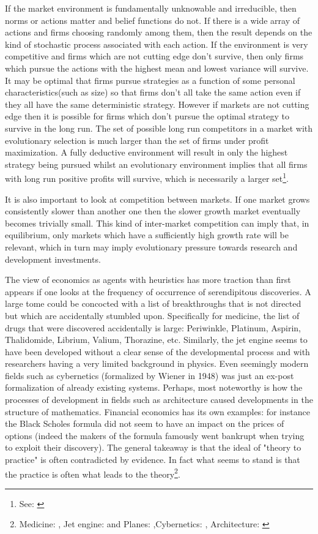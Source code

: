 If the market environment is fundamentally unknowable and irreducible, then norms or actions matter and belief functions do not. If there is a wide array of actions and firms choosing randomly among them, then the result depends on the kind of stochastic process associated with each action. If the environment is very competitive and firms which are not cutting edge don't survive, then only firms which pursue the actions with the highest mean and lowest variance will survive. It may be optimal that firms pursue strategies as a function of some personal characteristics(such as size) so that firms don't all take the same action even if they all have the same deterministic strategy. However if markets are not cutting edge then it is possible for firms which don't pursue the optimal strategy to survive in the long run. The set of possible long run competitors in a market with evolutionary selection is much larger than the set of firms under profit maximization. A fully deductive environment will result in only the highest strategy being pursued whilst an evolutionary environment implies that all firms with long run positive profits will survive, which is necessarily a larger set\footnote{See: \citep{alchian1950uncertainty}}. 

It is also important to look at competition between markets. If one market grows consistently slower than another one then the slower growth market eventually becomes trivially small. This kind of inter-market competition can imply that, in equilibrium, only markets which have a sufficiently high growth rate will be relevant, which in turn may imply evolutionary pressure towards research and development investments. 

The view of economics as agents with heuristics has more traction than first appears if one looks at the frequency of occurrence of serendipitous discoveries. A large tome could be concocted with a list of breakthroughs that is not directed but which are accidentally stumbled upon. Specifically for medicine, the list of drugs that were discovered accidentally is large: Periwinkle, Platinum, Aspirin, Thalidomide, Librium, Valium, Thorazine, etc. Similarly, the jet engine seems to have been developed without a clear sense of the developmental process and with researchers having a very limited background in physics. Even seemingly modern fields such as cybernetics (formalized by Wiener in 1948) was just an ex-post formalization of already existing systems. Perhaps, most noteworthy is how the processes of development in fields such as architecture caused developments in the structure of mathematics. Financial economics has its own examples: for instance the Black Scholes formula did not seem to have an impact on the prices of options (indeed the makers of the formula famously went bankrupt when trying to exploit their discovery). The general takeaway is that the ideal of "theory to practice" is often contradicted by evidence. In fact what seems to stand is that the practice is often what leads to the theory\footnote{ Medicine: \cite{meyers2007happy}, Jet engine: \cite{scranton2006urgency} and Planes: \cite{meyer2013airplane},Cybernetics: \cite{mindell2002between}, Architecture: \cite{unguru1992guy}}.

